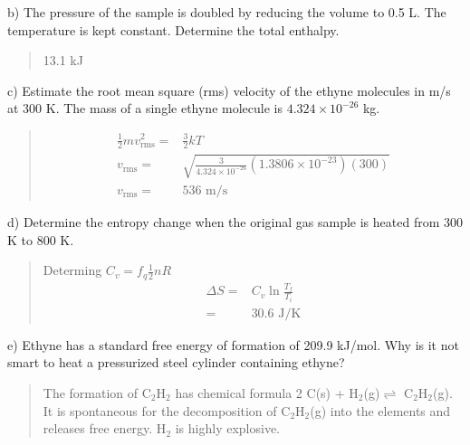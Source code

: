 \documentclass[11pt]{article}
\newcommand{\brian}[1]{
  {\begin{quote}
      \color{blue} #1
  \end{quote}}
}
\begin{document}
b) The pressure of the sample is doubled by reducing the volume to 0.5 L. The
temperature is kept constant. Determine the total enthalpy.

\brian{13.1 kJ}

c) Estimate the root mean square (rms) velocity of the ethyne molecules in m/s at 300 K.
The mass of a single ethyne molecule is $4.324\times 10^{-26}$ kg.

\brian{
  \begin{align*}
    \frac{1}{2}mv^2_\text{rms} = & \frac{3}{2}kT \\
    v_\text{rms} = & \sqrt{\frac{3}{4.324\times 10^{-26}}(1.3806\times 10^{-23})(300)} \\
    v_\text{rms} = & 536 \text{ m/s}
  \end{align*}
}

d) Determine the entropy change when the original gas sample is heated from 300 K to
800 K.

\brian{Determing $C_v = f_q\frac{1}{2}nR$
  \begin{align*}
    \Delta S = & C_v\ln\frac{T_f}{T_i} \\
    = & 30.6 \text{ J/K}
  \end{align*}
}

e) Ethyne has a standard free energy of formation of 209.9 kJ/mol. Why is it not smart
to heat a pressurized steel cylinder containing ethyne?

\brian{The formation of C$_2$H$_2$ has chemical formula 2 C(s) + H$_2$(g)$\rightleftharpoons$ C$_2$H$_2$(g).
  It is spontaneous for the decomposition of C$_2$H$_2$(g) into the elements and releases free energy.
  H$_2$ is highly explosive.
}
\end{document}
